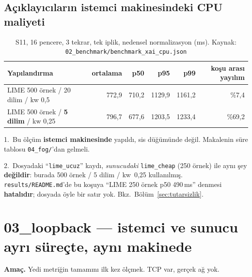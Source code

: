 \documentclass[11pt,a4paper]{report}
\newcommand{\ms}{\,ms}
\newcommand{\kod}[1]{\texttt{\small #1}}
\newcommand{\dosya}[1]{\texttt{\footnotesize #1}}
\begin{document}
\subsection{Açıklayıcıların istemci makinesindeki CPU maliyeti}

\begin{table}[H]
\centering\small
\begin{tabular}{@{}lrrrrr@{}}
\toprule
\textbf{Yapılandırma} & \textbf{ortalama} & \textbf{p50} & \textbf{p95} & \textbf{p99} & \textbf{koşu arası yayılım} \\
\midrule
LIME 500 örnek / 20 dilim / kw 0{,}5 & 772{,}9 & 710{,}2 & 1129{,}9 & 1161{,}2 & \%7{,}4 \\
LIME 500 örnek / \textbf{5 dilim} / kw 0{,}25 & 796{,}7 & 677{,}6 & 1203{,}5 & 1233{,}4 & \%69{,}2 \\
\bottomrule
\end{tabular}
\caption{S11, 16 pencere, 3 tekrar, tek iplik, nedensel normalizasyon (ms).
Kaynak: \dosya{02\_benchmark/benchmark\_xai\_cpu.json}}
\end{table}

\begin{uyari}
1.~Bu ölçüm \textbf{istemci makinesinde} yapıldı, sis düğümünde değil. Makalenin
süre tablosu \dosya{04\_fog/}'dan gelmeli.

2.~Dosyadaki ``\kod{lime\_ucuz}'' kaydı, \emph{sunucudaki} \kod{lime\_cheap}
(250 örnek) ile aynı şey \textbf{değildir}: burada 500 örnek / 5 dilim /
kw~0{,}25 kullanılmış. \dosya{results/README.md}'de bu koşuya ``LIME 250 örnek
p50 490\ms'' denmesi \textbf{hatalıdır}; dosyada öyle bir satır yok.
Bkz.\ Bölüm~\ref{sec:tutarsizlik}.
\end{uyari}

\section{03\_loopback --- istemci ve sunucu ayrı süreçte, aynı makinede}

\textbf{Amaç.} Yedi metriğin tamamını ilk kez ölçmek. TCP var, gerçek ağ yok.
\end{document}
